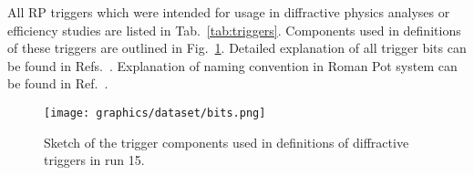 All RP triggers which were intended for usage in diffractive physics analyses or efficiency studies are listed in Tab.~\ref{tab:triggers}. Components used in definitions of these triggers are outlined in Fig.~\ref{fig:triggerBits}. Detailed explanation of all trigger bits can be found in Refs.~\cite{RpTriggers,RpTriggers2}. Explanation of naming convention in Roman Pot system can be found in Ref.~\cite{Labeling}.

\begin{figure}[h]\vspace*{-6pt}
 \centering%
 \texttt{[image: graphics/dataset/bits.png]}%
 \caption{Sketch of the trigger components used in definitions of diffractive triggers in run 15.}\label{fig:triggerBits}%
 \end{figure}


